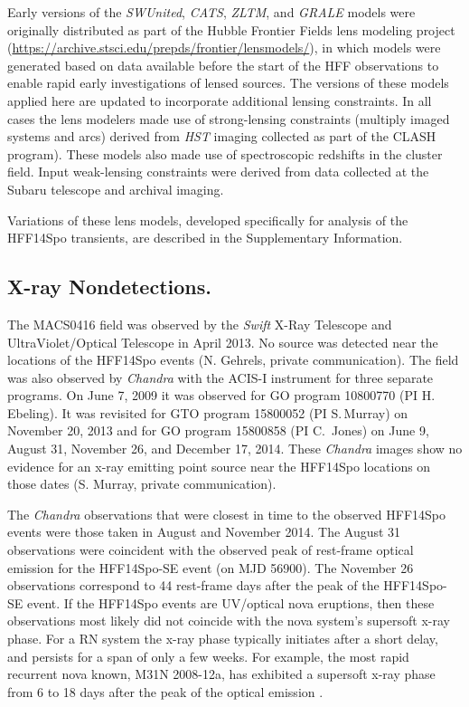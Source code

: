 \documentclass{article}
\providecommand\citep{\cite}
\def\HST{{\it HST}\xspace}
\def\Chandra{{\it Chandra}\xspace}
\def\Swift{{\it Swift}\xspace}
\def\spock{HFF14Spo\xspace}
\def\spocktwo{HFF14Spo-SE\xspace}
\def\MACS0416{MACS0416\xspace}
\begin{document}
Early versions of the {\it SWUnited}, {\it CATS}, {\it ZLTM}, and {\it
  GRALE} models were originally distributed as part of the Hubble
Frontier Fields lens modeling project
(\url{https://archive.stsci.edu/prepds/frontier/lensmodels/}), in
which models were generated based on data available before the start
of the HFF observations to enable rapid early investigations of lensed
sources. The versions of these models applied here are updated to
incorporate additional lensing constraints.  In all cases the lens
modelers made use of strong-lensing constraints (multiply imaged
systems and arcs) derived from \HST imaging collected as part of the
CLASH program\cite{Postman:2012}). These
models also made use of spectroscopic redshifts in the cluster
field\cite{Mann:2012, Christensen:2012, Grillo:2015, Caminha:2017}.
Input weak-lensing constraints were derived from data collected at the
Subaru telescope\cite{Umetsu:2014, Umetsu:2016} and archival imaging.

Variations of these lens models, developed specifically for analysis
of the \spock transients, are described in the Supplementary
Information.

\subsection{X-ray Nondetections.}\label{sec:Xray}

The \MACS0416 field was observed by the \Swift X-Ray Telescope
and UltraViolet/Optical Telescope in April 2013.  No source was
detected near the locations of the \spock events (N. Gehrels, private
communication).  The field was also observed by \Chandra with the
ACIS-I instrument for three separate programs.  On June 7, 2009 it was
observed for GO program 10800770 (PI H.\,Ebeling).  It was revisited
for GTO program 15800052 (PI S.\,Murray) on November 20, 2013 and for
GO program 15800858 (PI C.\, Jones) on June 9, August 31, November
26, and December 17, 2014. These \Chandra images show no evidence for
an x-ray emitting point source near the \spock locations on those
dates (S. Murray, private communication).

The \Chandra observations that were closest in time to the observed
\spock events were those taken in August and November 2014.  The
August 31 observations were coincident with the observed peak of
rest-frame optical emission for the \spocktwo event (on MJD
56900). The November 26 observations correspond to 44 rest-frame days
after the peak of the \spocktwo event. If the \spock events are
UV/optical nova eruptions, then these observations most likely did not
coincide with the nova system's supersoft x-ray phase. For a RN system
the x-ray phase typically initiates after a short delay, and persists
for a span of only a few weeks. For example, the most rapid recurrent
nova known, M31N 2008-12a, has exhibited a supersoft x-ray phase from
6 to 18 days after the peak of the optical emission
\citep{Henze:2015a}.
\end{document}
